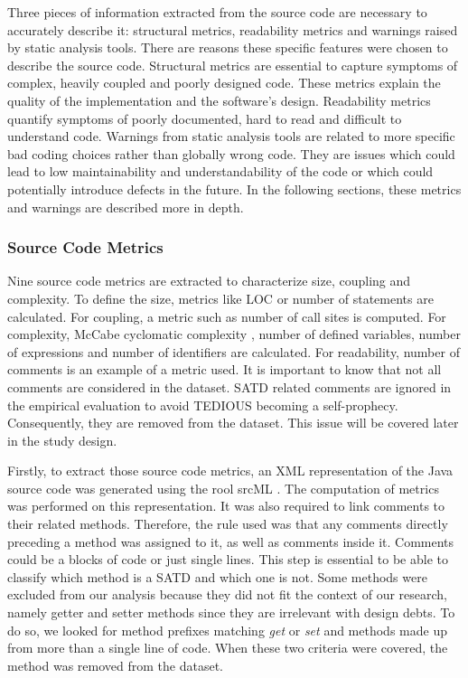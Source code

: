 Three pieces of information extracted from the source code are necessary to accurately describe it: structural metrics, readability metrics and warnings raised by static analysis tools. There are reasons these specific features were chosen to describe the source code. Structural metrics are essential to capture symptoms of complex, heavily coupled and poorly designed code. These metrics explain the quality of the implementation and the software's design. Readability metrics quantify symptoms of poorly documented, hard to read and difficult to understand code. Warnings from static analysis tools are related to more specific bad coding choices rather than globally wrong code. They are issues which could lead to low maintainability and understandability of the code or which could potentially introduce defects in the future. In the following sections, these metrics and warnings are described more in depth.

\subsubsection{Source Code Metrics}

Nine source code metrics are extracted to characterize size, coupling and complexity. To define the size, metrics like \ac{LOC} or number of statements are calculated. For coupling, a metric such as number of call sites is computed. For complexity, McCabe cyclomatic complexity \citep{mccabe1990reverse}, number of defined variables, number of expressions and number of identifiers are calculated. For readability, number of comments is an example of a metric used. It is important to know that not all comments are considered in the dataset. \ac{SATD} related comments are ignored in the empirical evaluation to avoid \ac{TEDIOUS} becoming a self-prophecy. Consequently, they are removed from the dataset. This issue will be covered later in the study design. \par

Firstly, to extract those source code metrics, an XML representation of the Java source code was generated using the rool srcML \citep{CollardKM03}. The computation of metrics was performed on this representation. It was also required to link comments to their related methods. Therefore, the rule used was that any comments directly preceding a method was assigned to it, as well as comments inside it. Comments could be a blocks of code or just single lines. This step is essential to be able to classify which method is a \ac{SATD} and which one is not. Some methods were excluded from our analysis because they did not fit the context of our research, namely getter and setter methods since they are irrelevant with design debts. To do so, we looked for method prefixes matching \emph{get} or \emph{set} and methods made up from more than a single line of code. When these two criteria were covered, the method was removed from the dataset. \par 

